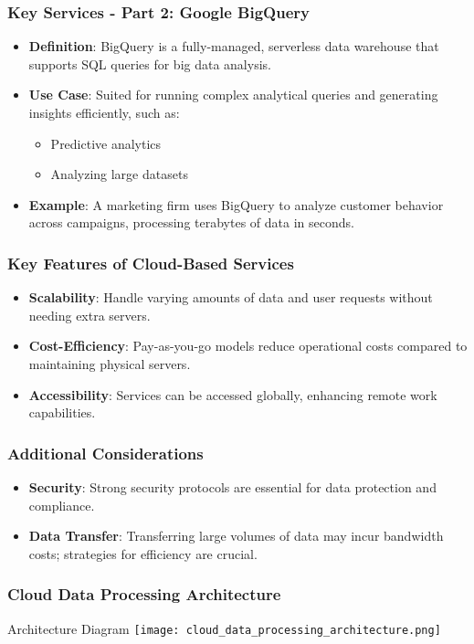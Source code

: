 \documentclass[aspectratio=169]{beamer}
\begin{document}
\begin{frame}[fragile]
    \frametitle{Key Services - Part 2: Google BigQuery}
    \begin{itemize}
        \item \textbf{Definition}: BigQuery is a fully-managed, serverless data warehouse that supports SQL queries for big data analysis.
        \item \textbf{Use Case}: Suited for running complex analytical queries and generating insights efficiently, such as:
        \begin{itemize}
            \item Predictive analytics
            \item Analyzing large datasets
        \end{itemize}
        \item \textbf{Example}: A marketing firm uses BigQuery to analyze customer behavior across campaigns, processing terabytes of data in seconds.
    \end{itemize}
\end{frame}

\begin{frame}[fragile]
    \frametitle{Key Features of Cloud-Based Services}
    \begin{itemize}
        \item \textbf{Scalability}: Handle varying amounts of data and user requests without needing extra servers.
        \item \textbf{Cost-Efficiency}: Pay-as-you-go models reduce operational costs compared to maintaining physical servers.
        \item \textbf{Accessibility}: Services can be accessed globally, enhancing remote work capabilities.
    \end{itemize}
\end{frame}

\begin{frame}[fragile]
    \frametitle{Additional Considerations}
    \begin{itemize}
        \item \textbf{Security}: Strong security protocols are essential for data protection and compliance.
        \item \textbf{Data Transfer}: Transferring large volumes of data may incur bandwidth costs; strategies for efficiency are crucial.
    \end{itemize}
\end{frame}

\begin{frame}[fragile]
    \frametitle{Cloud Data Processing Architecture}
    \begin{block}{Architecture Diagram}
        \centering
        \texttt{[image: cloud\_data\_processing\_architecture.png]}
    \end{block}
\end{frame}
\end{document}
